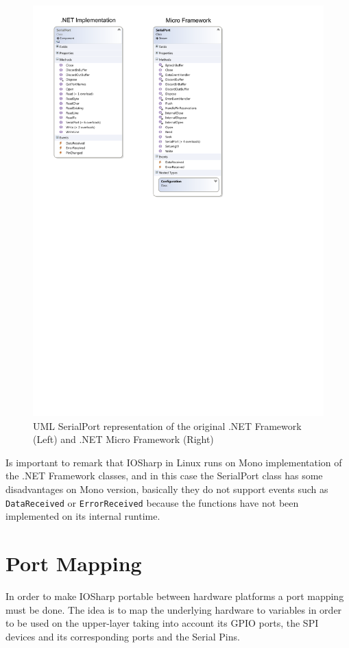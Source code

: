 \begin{figure}[H]\begin{center}
 \centering
  \captionsetup{justification=centering}
  \includegraphics[scale=1]{pictures/iosharp/serialport-uml}
  \caption{UML SerialPort representation of the original .NET Framework (Left) and .NET Micro Framework (Right)\label{fig:serialport-uml}}
\end{center}\end{figure}

Is important to remark that IOSharp in Linux runs on Mono implementation of the .NET Framework classes, and in this case the SerialPort class has some disadvantages on Mono version, basically they do not support events such as \verb!DataReceived! or \verb!ErrorReceived! because the functions have not been implemented on its internal runtime.

\section{Port Mapping}\label{S:Port-Mapping}
In order to make IOSharp portable between hardware platforms a port mapping must be done. The idea is to map the underlying hardware to variables in order to be used on the upper-layer taking into account its GPIO ports, the SPI devices and its corresponding ports and the Serial Pins.

